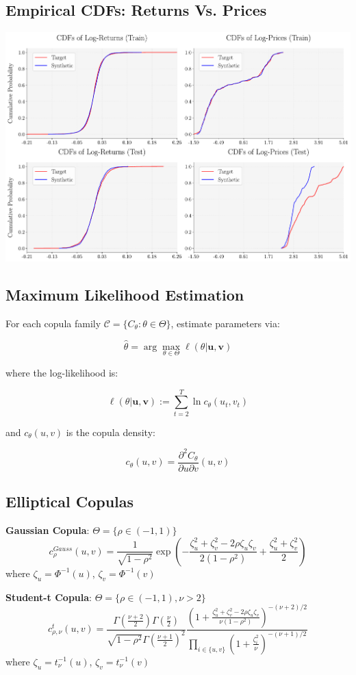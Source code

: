 \documentclass[
  letterpaper,
  DIV=11,
  numbers=noendperiod]{scrartcl}
\begin{document}
\subsection{Empirical CDFs: Returns Vs.
Prices}\label{empirical-cdfs-returns-vs.-prices}

\begin{center}
\includegraphics[width=0.5\linewidth,height=\textheight,keepaspectratio]{simple_Presentation_files/mediabag/images/converted/all_CDFs_comparison.pdf}
\end{center}

\subsection{Maximum Likelihood
Estimation}\label{maximum-likelihood-estimation}

For each copula family
\(\mathcal{C} = \{C_\theta : \theta \in \Theta\}\), estimate parameters
via:

\[\hat{\theta} = \arg\max_{\theta \in \Theta} \ell(\theta | \mathbf{u,v})\]

where the log-likelihood is:

\[\ell(\theta| \mathbf{u,v}) := \sum_{t=2}^T \ln c_\theta(u_t, v_t)\]

and \(c_\theta(u,v)\) is the copula density:

\[c_\theta(u,v) = \frac{\partial^2 C_\theta}{\partial u \partial v}(u,v)\]

\subsection{Elliptical Copulas}\label{elliptical-copulas}

\textbf{Gaussian Copula}: \(\Theta = \{\rho \in (-1,1)\}\)
\[c_\rho^{Gauss}(u,v) = \frac{1}{\sqrt{1-\rho^2}} \exp\left(-\frac{\zeta_u^2 + \zeta_v^2 - 2\rho\zeta_u\zeta_v}{2(1-\rho^2)} + \frac{\zeta_u^2 + \zeta_v^2}{2}\right)\]
where \(\zeta_u = \Phi^{-1}(u)\), \(\zeta_v = \Phi^{-1}(v)\)

\textbf{Student-t Copula}: \(\Theta = \{\rho \in (-1,1), \nu > 2\}\)
\[c_{\rho,\nu}^{t}(u,v) = \frac{\Gamma(\frac{\nu+2}{2})\Gamma(\frac{\nu}{2})}{\sqrt{1-\rho^2}\Gamma(\frac{\nu+1}{2})^2} 
\frac{(1 + \frac{\zeta_u^2 + \zeta_v^2 - 2\rho\zeta_u\zeta_v}{\nu(1-\rho^2)})^{-(\nu+2)/2}}{\prod_{i\in\{u,v\}} (1 + \frac{\zeta_i^2}{\nu})^{-(\nu+1)/2}}
\] where \(\zeta_u = t_\nu^{-1}(u)\), \(\zeta_v = t_\nu^{-1}(v)\)
\end{document}
